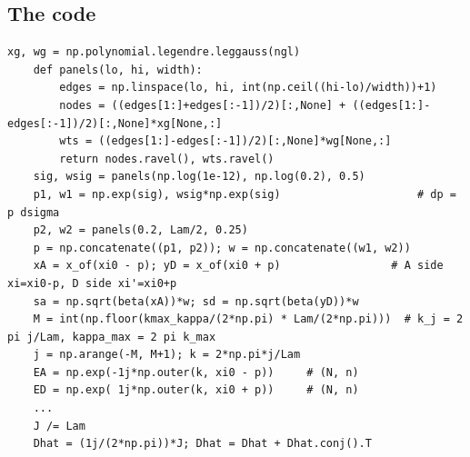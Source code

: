 \documentclass[11pt]{article}
\newcommand{\file}[1]{\texttt{\detokenize{#1}}}
\begin{document}
\subsection{The code}

\begin{lstlisting}[caption={\file{numerics/defect_matrix.py}, lines 19--51 (abridged)},captionpos=b,firstnumber=19]
    xg, wg = np.polynomial.legendre.leggauss(ngl)
    def panels(lo, hi, width):
        edges = np.linspace(lo, hi, int(np.ceil((hi-lo)/width))+1)
        nodes = ((edges[1:]+edges[:-1])/2)[:,None] + ((edges[1:]-edges[:-1])/2)[:,None]*xg[None,:]
        wts = ((edges[1:]-edges[:-1])/2)[:,None]*wg[None,:]
        return nodes.ravel(), wts.ravel()
    sig, wsig = panels(np.log(1e-12), np.log(0.2), 0.5)
    p1, w1 = np.exp(sig), wsig*np.exp(sig)                     # dp = p dsigma
    p2, w2 = panels(0.2, Lam/2, 0.25)
    p = np.concatenate((p1, p2)); w = np.concatenate((w1, w2))
    xA = x_of(xi0 - p); yD = x_of(xi0 + p)                 # A side xi=xi0-p, D side xi'=xi0+p
    sa = np.sqrt(beta(xA))*w; sd = np.sqrt(beta(yD))*w
    M = int(np.floor(kmax_kappa/(2*np.pi) * Lam/(2*np.pi)))  # k_j = 2 pi j/Lam, kappa_max = 2 pi k_max
    j = np.arange(-M, M+1); k = 2*np.pi*j/Lam
    EA = np.exp(-1j*np.outer(k, xi0 - p))     # (N, n)
    ED = np.exp( 1j*np.outer(k, xi0 + p))     # (N, n)
    ...
    J /= Lam
    Dhat = (1j/(2*np.pi))*J; Dhat = Dhat + Dhat.conj().T
\end{lstlisting}
\end{document}
